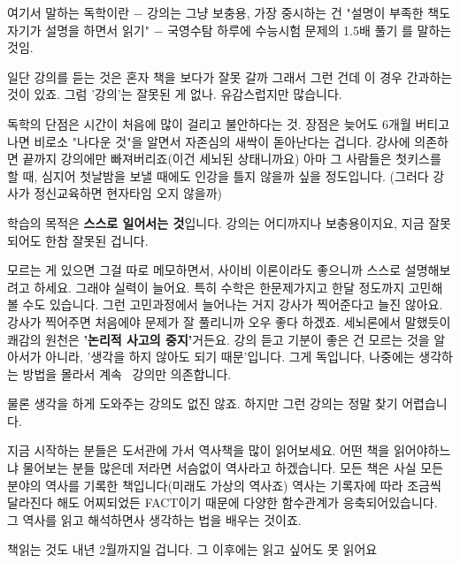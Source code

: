 여기서 말하는 독학이란
$-$ 강의는 그냥 보충용, 가장 중시하는 건 "설명이 부족한 책도 자기가 설명을 하면서 읽기"
$-$ 국영수탐 하루에 수능시험 문제의 1.5배 풀기
를 말하는 것임.
\vspace{5mm}

일단 강의를 듣는 것은 혼자 책을 보다가 잘못 갈까 그래서 그런 건데
이 경우 간과하는 것이 있죠. 그럼 '강의'는 잘못된 게 없나. 유감스럽지만 많습니다.
\vspace{5mm}

독학의 단점은 시간이 처음에 많이 걸리고 불안하다는 것.
장점은 늦어도 6개월 버티고 나면 비로소 "나다운 것"을 알면서 자존심의 새싹이 돋아난다는 겁니다.
강사에 의존하면 끝까지 강의에만 빠져버리죠(이건 세뇌된 상태니까요)
아마 그 사람들은 첫키스를 할 때, 심지어 첫날밤을 보낼 때에도 인강을 틀지 않을까 싶을 정도입니다.
(그러다 강사가 정신교육하면 현자타임 오지 않을까)
\vspace{5mm}

학습의 목적은 \textbf{스스로 일어서는 것}입니다. 강의는 어디까지나 보충용이지요, 지금 잘못되어도 한참 잘못된 겁니다.
\vspace{5mm}

모르는 게 있으면 그걸 따로 메모하면서, 사이비 이론이라도 좋으니까 스스로 설명해보려고 하세요. 그래야 실력이 늘어요.
특히 수학은 한문제가지고 한달 정도까지 고민해 볼 수도 있습니다. 그런 고민과정에서 늘어나는 거지 강사가 찍어준다고 늘진 않아요.
강사가 찍어주면 처음에야 문제가 잘 풀리니까 오우 좋다 하겠죠. 세뇌론에서 말했듯이 쾌감의 원천은 \textbf{'논리적 사고의 중지'}거든요.
강의 듣고 기분이 좋은 건 모르는 것을 알아서가 아니라, '생각을 하지 않아도 되기 때문'입니다.
그게 독입니다, 나중에는 생각하는 방법을 몰라서 계속  강의만 의존합니다.
\vspace{5mm}

물론 생각을 하게 도와주는 강의도 없진 않죠. 하지만 그런 강의는 정말 찾기 어렵습니다.
\vspace{5mm}

지금 시작하는 분들은 도서관에 가서 역사책을 많이 읽어보세요.
어떤 책을 읽어야하느냐 물어보는 분들 많은데 저라면 서슴없이 역사라고 하겠습니다.
모든 책은 사실 모든 분야의 역사를 기록한 책입니다(미래도 가상의 역사죠)
역사는 기록자에 따라 조금씩 달라진다 해도 어찌되었든 FACT이기 때문에 다양한 함수관계가 응축되어있습니다.
그 역사를 읽고 해석하면사 생각하는 법을 배우는 것이죠.
\vspace{5mm}

책읽는 것도 내년 2월까지일 겁니다. 그 이후에는 읽고 싶어도 못 읽어요
\vspace{5mm}

